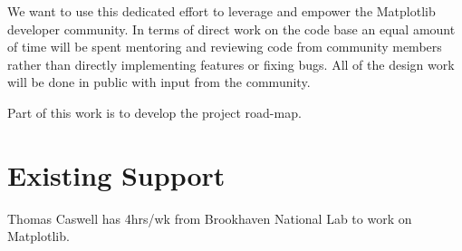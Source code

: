 \documentclass[11pt]{article}  %
\begin{document}
We want to use this dedicated effort to leverage and empower the
Matplotlib developer community.  In terms of direct work on the code
base an equal amount of time will be spent mentoring and reviewing
code from community members rather than directly implementing features
or fixing bugs.  All of the design work will be done in public with
input from the community.

Part of this work is to develop the project road-map.


\section{Existing Support}

Thomas Caswell has 4hrs/wk from Brookhaven National Lab to work on Matplotlib.


\clearpage

\end{document}
